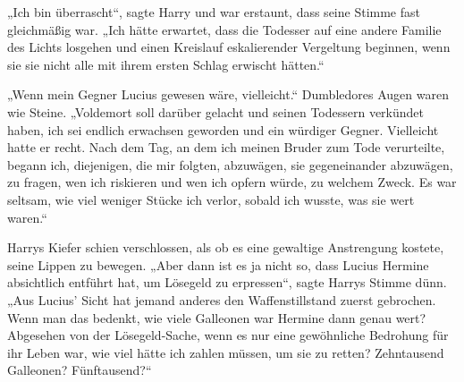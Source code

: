 „Ich bin überrascht“, sagte Harry und war erstaunt, dass seine Stimme fast gleichmäßig war.
„Ich hätte erwartet, dass die Todesser auf eine andere Familie des Lichts losgehen und einen Kreislauf eskalierender Vergeltung beginnen, wenn sie sie nicht alle mit ihrem ersten Schlag erwischt hätten.“

„Wenn mein Gegner Lucius gewesen wäre, vielleicht.“
Dumbledores Augen waren wie Steine.
„Voldemort soll darüber gelacht und seinen Todessern verkündet haben, ich sei endlich erwachsen geworden und ein würdiger Gegner. Vielleicht hatte er recht. Nach dem Tag, an dem ich meinen Bruder zum Tode verurteilte, begann ich, diejenigen, die mir folgten, abzuwägen, sie gegeneinander abzuwägen, zu fragen, wen ich riskieren und wen ich opfern würde, zu welchem Zweck. Es war seltsam, wie viel weniger Stücke ich verlor, sobald ich wusste, was sie wert waren.“

Harrys Kiefer schien verschlossen, als ob es eine gewaltige Anstrengung kostete, seine Lippen zu bewegen.
„Aber dann ist es ja nicht so, dass Lucius Hermine absichtlich entführt hat, um Lösegeld zu erpressen“, sagte Harrys Stimme dünn.
„Aus Lucius’ Sicht hat jemand anderes den Waffenstillstand zuerst gebrochen. Wenn man das bedenkt, wie viele Galleonen war Hermine dann genau wert? Abgesehen von der Lösegeld-Sache, wenn es nur eine gewöhnliche Bedrohung für ihr Leben war, wie viel hätte ich zahlen müssen, um sie zu retten? Zehntausend Galleonen? Fünftausend?“

